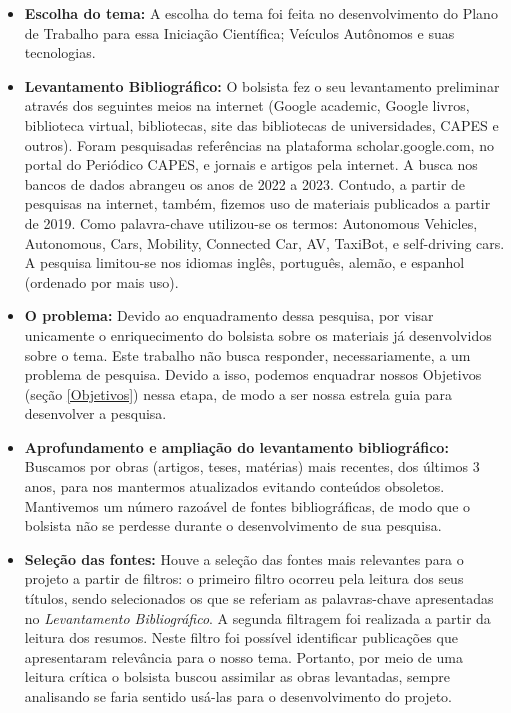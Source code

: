 \begin{itemize}

\item \textbf{Escolha do tema:} A escolha do tema foi feita no desenvolvimento do Plano de Trabalho para essa Iniciação Científica; Veículos Autônomos e suas tecnologias. 

\item \textbf{Levantamento Bibliográfico:} O bolsista fez o seu levantamento preliminar através dos seguintes meios na internet (Google academic, Google livros, biblioteca virtual, bibliotecas, site das bibliotecas de universidades, CAPES e outros). Foram pesquisadas referências na plataforma scholar.google.com, no portal do Periódico CAPES, e jornais e artigos pela internet. A busca nos bancos de dados abrangeu os anos de 2022 a 2023. Contudo, a partir de pesquisas na internet, também, fizemos uso de materiais publicados a partir de 2019. Como palavra-chave utilizou-se os termos: Autonomous Vehicles, Autonomous, Cars, Mobility, Connected Car, AV, TaxiBot, e self-driving cars.  A pesquisa limitou-se nos idiomas inglês, português,  alemão, e espanhol (ordenado por mais uso).


\item \textbf{O problema:} Devido ao enquadramento dessa pesquisa, por visar unicamente o enriquecimento do bolsista sobre os materiais já desenvolvidos sobre o tema. Este trabalho não busca responder, necessariamente, a um problema de pesquisa. Devido a isso, podemos enquadrar nossos Objetivos (seção \ref{Objetivos}) nessa etapa, de modo a ser nossa estrela guia para desenvolver a pesquisa.

\item \textbf{Aprofundamento e ampliação do levantamento bibliográfico:} Buscamos por obras (artigos, teses, matérias) mais recentes, dos últimos 3 anos, para nos mantermos atualizados evitando conteúdos obsoletos. Mantivemos um número razoável de fontes bibliográficas, de modo que o bolsista não se perdesse durante o desenvolvimento de sua pesquisa. 

\item \textbf{Seleção das fontes:} Houve a seleção das fontes mais relevantes para o projeto a partir de filtros: o primeiro filtro ocorreu pela leitura dos seus títulos, sendo selecionados os que se referiam as palavras-chave apresentadas no \textit{Levantamento Bibliográfico}. A segunda filtragem foi realizada a partir da leitura dos resumos. Neste filtro foi possível identificar publicações que apresentaram relevância para o nosso tema.
Portanto, por meio de uma leitura crítica o bolsista buscou assimilar as obras levantadas, sempre analisando se faria sentido usá-las para o desenvolvimento do projeto. 


\end{itemize}
